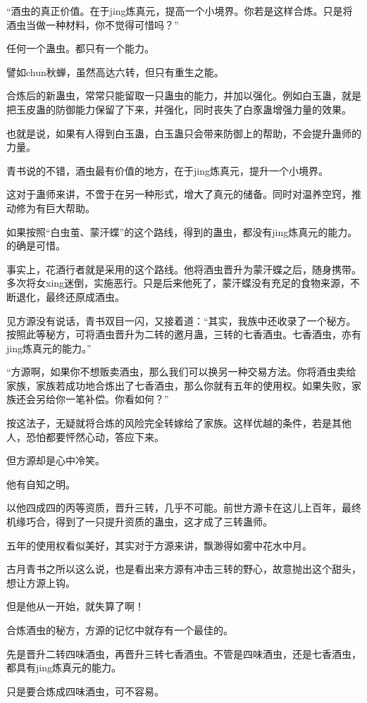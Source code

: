\begin{this_body}
“酒虫的真正价值。在于jing炼真元，提高一个小境界。你若是这样合炼。只是将酒虫当做一种材料，你不觉得可惜吗？”

任何一个蛊虫。都只有一个能力。

譬如chun秋蝉，虽然高达六转，但只有重生之能。

合炼后的新蛊虫，常常只能留取一只蛊虫的能力，并加以强化。例如白玉蛊，就是把玉皮蛊的防御能力保留了下来，并强化，同时丧失了白豕蛊增强力量的效果。

也就是说，如果有人得到白玉蛊，白玉蛊只会带来防御上的帮助，不会提升蛊师的力量。

青书说的不错，酒虫最有价值的地方，在于jing炼真元，提升一个小境界。

这对于蛊师来讲，不啻于在另一种形式，增大了真元的储备。同时对温养空窍，推动修为有巨大帮助。

如果按照“白虫茧、蒙汗蝶”的这个路线，得到的蛊虫，都没有jing炼真元的能力。的确是可惜。

事实上，花酒行者就是采用的这个路线。他将酒虫晋升为蒙汗蝶之后，随身携带。多次将女xing迷倒，实施恶行。只是后来他死了，蒙汗蝶没有充足的食物来源，不断退化，最终还原成酒虫。

见方源没有说话，青书双目一闪，又接着道：“其实，我族中还收录了一个秘方。按照此等秘方，可将酒虫晋升为二转的邀月蛊，三转的七香酒虫。七香酒虫，亦有jing炼真元的能力。”

“方源啊，如果你不想贩卖酒虫，那么我们可以换另一种交易方法。你将酒虫卖给家族，家族若成功地合炼出了七香酒虫，那么你就有五年的使用权。如果失败，家族还会另给你一笔补偿。你看如何？”

按这法子，无疑就将合炼的风险完全转嫁给了家族。这样优越的条件，若是其他人，恐怕都要怦然心动，答应下来。

但方源却是心中冷笑。

他有自知之明。

以他四成四的丙等资质，晋升三转，几乎不可能。前世方源卡在这儿上百年，最终机缘巧合，得到了一只提升资质的蛊虫，这才成了三转蛊师。

五年的使用权看似美好，其实对于方源来讲，飘渺得如雾中花水中月。

古月青书之所以这么说，也是看出来方源有冲击三转的野心，故意抛出这个甜头，想让方源上钩。

但是他从一开始，就失算了啊！

合炼酒虫的秘方，方源的记忆中就存有一个最佳的。

先是晋升二转四味酒虫，再晋升三转七香酒虫。不管是四味酒虫，还是七香酒虫，都具有jing炼真元的能力。

只是要合炼成四味酒虫，可不容易。


\end{this_body}
